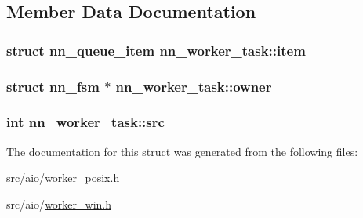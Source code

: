 \subsection{Member Data Documentation}
\subsubsection[{item}]{\setlength{\rightskip}{0pt plus 5cm}struct {\bf nn\+\_\+queue\+\_\+item} nn\+\_\+worker\+\_\+task\+::item}\hypertarget{structnn__worker__task_aada79ededec6bb2e9ff44ecf0fd44e85}{}\label{structnn__worker__task_aada79ededec6bb2e9ff44ecf0fd44e85}
\subsubsection[{owner}]{\setlength{\rightskip}{0pt plus 5cm}struct {\bf nn\+\_\+fsm} $\ast$ nn\+\_\+worker\+\_\+task\+::owner}\hypertarget{structnn__worker__task_af9d121f46294915e9613f9c10a87388a}{}\label{structnn__worker__task_af9d121f46294915e9613f9c10a87388a}
\subsubsection[{src}]{\setlength{\rightskip}{0pt plus 5cm}int nn\+\_\+worker\+\_\+task\+::src}\hypertarget{structnn__worker__task_a4156adeadc92ae737bf02d525699b642}{}\label{structnn__worker__task_a4156adeadc92ae737bf02d525699b642}


The documentation for this struct was generated from the following files\+:\begin{DoxyCompactItemize}
\item 
src/aio/\hyperlink{worker__posix_8h}{worker\+\_\+posix.\+h}\item 
src/aio/\hyperlink{worker__win_8h}{worker\+\_\+win.\+h}\end{DoxyCompactItemize}
